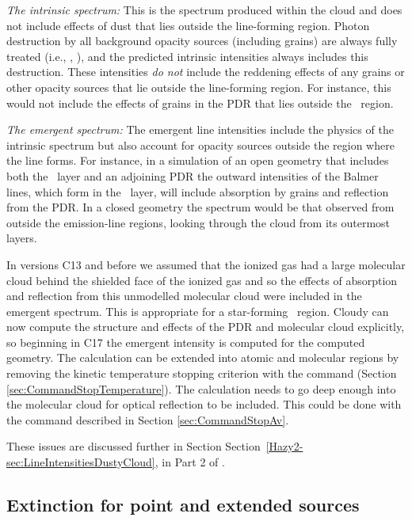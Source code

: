 \emph{The intrinsic spectrum:}
This is the spectrum produced within the cloud
and does not include effects of dust that lies outside the line-forming
region.
Photon destruction by all background opacity sources (including
grains) are always fully treated (i.e., \citealp{Hummer1968},
\citealp{Kalkofen1987}),
and the predicted intrinsic
intensities always includes this destruction.
These intensities \emph{do not}
include the reddening effects of any grains or
other opacity sources that
lie outside the line-forming region.
For instance, this would not include the effects of grains
in the PDR that lies outside the \hplus\ region.

\emph{The emergent spectrum:}  
The emergent line intensities include the physics of the intrinsic spectrum
but also account for opacity sources outside the region where the line forms.
For instance, in a simulation of an open geometry that includes both the \hplus\ layer and an adjoining
PDR the outward intensities of the Balmer lines, which form in the \hplus\ layer, 
will include absorption by grains and
reflection from the PDR.
In a closed geometry the spectrum would be that observed
from outside the emission-line regions, looking through the
cloud from its outermost layers.

In versions C13 and before we assumed that the ionized
gas had a large molecular cloud behind the shielded face of the ionized
gas and so the effects of absorption and reflection from this unmodelled molecular cloud were included
in the emergent spectrum.  
This is appropriate for a star-forming \hii\ region.
Cloudy can now compute the structure and effects of the PDR and molecular cloud explicitly,
so beginning in C17 the emergent intensity is computed for the computed geometry.
The calculation can be extended into atomic and molecular regions by removing the
kinetic temperature stopping criterion with the  command
 (Section \ref{sec:CommandStopTemperature}).
The calculation needs to go deep enough into the molecular cloud for optical reflection
to be included.  This could be done with the command 
described in Section \ref{sec:CommandStopAv}.

These issues are discussed further in Section
Section~\ref{Hazy2-sec:LineIntensitiesDustyCloud},
in Part 2 of \Hazy.

\subsection{Extinction for point and extended sources}

